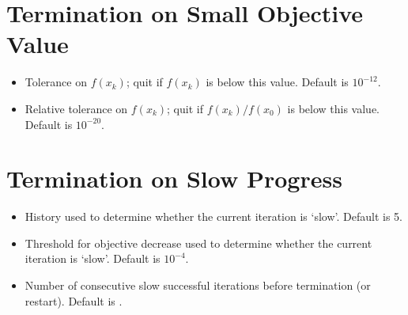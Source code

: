 \documentclass[letterpaper,10pt,english]{sphinxmanual}
\begin{document}
\section{Termination on Small Objective Value}
\label{\detokenize{advanced:termination-on-small-objective-value}}\begin{itemize}
\item {} 
\sphinxAtStartPar
{} \sphinxhyphen{} Tolerance on \(f(x_k)\); quit if \(f(x_k)\) is below this value. Default is \(10^{-12}\).

\item {} 
\sphinxAtStartPar
{} \sphinxhyphen{} Relative tolerance on \(f(x_k)\); quit if \(f(x_k)/f(x_0)\) is below this value. Default is \(10^{-20}\).

\end{itemize}


\section{Termination on Slow Progress}
\label{\detokenize{advanced:termination-on-slow-progress}}\begin{itemize}
\item {} 
\sphinxAtStartPar
{} \sphinxhyphen{} History used to determine whether the current iteration is ‘slow’. Default is 5.

\item {} 
\sphinxAtStartPar
{} \sphinxhyphen{} Threshold for objective decrease used to determine whether the current iteration is ‘slow’. Default is \(10^{-4}\).

\item {} 
\sphinxAtStartPar
{} \sphinxhyphen{} Number of consecutive slow successful iterations before termination (or restart). Default is .

\end{itemize}
\end{document}
